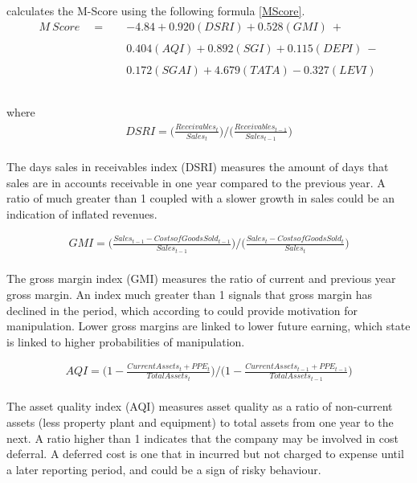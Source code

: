 {\cite{beneishOG} calculates the M-Score using the following formula \ref{MScore}.
\begin {equation}\label{MScore}
\begin{aligned}
M \ Score \quad =  \quad & -4.84 + 0.920(DSRI) + 0.528(GMI) \ + \\\\ 
		& 0.404(AQI)+ 0.892(SGI) + 0.115(DEPI) \ - \\\\
		& 0.172(SGAI) + 4.679(TATA) - 0.327(LEVI)  \ \\\\
\end{aligned}
\end{equation}\\
where
\begin {equation}\label{MScore-DSRI}
\begin{aligned}
DSRI = \bigg( \frac{Receivables_t}{Sales_t} \bigg) / \bigg( \frac{Receivables_{t-1}}{Sales_{t-1}} \bigg) 
\end{aligned}
\end{equation}\\
The days sales in receivables index (DSRI) measures the amount of days that sales are in accounts receivable in one year compared to the previous year. A ratio of much greater than 1 coupled with a slower growth in sales could be an indication of inflated revenues. 

\begin{equation}\label{MScore-GMI}
\begin{aligned}
GMI = \bigg( \frac{Sales_{t-1} - Costs of Goods Sold_{t-1}}{Sales_{t-1}} \bigg) / \bigg( \frac{Sales_{t} - Costs of Goods Sold_{t}}{Sales_{t}} \bigg)
\end{aligned}
\end{equation}\\
The gross margin index (GMI) measures the ratio of current and previous year gross margin. An index much greater than 1 signals that gross margin has declined in the period, which according to \cite{mahamaCorpFraud} could provide motivation for manipulation. Lower gross margins are linked to lower future earning, which \cite{beneishCost} state is linked to higher probabilities of manipulation.     

\begin{equation}\label{MScore-AQI}
\begin{aligned}
AQI = \bigg( 1 - \frac{Current Assets_t + PPE_t}{Total Assets_t} \bigg) /  \bigg( 1 - \frac{Current Assets_{t-1} + PPE_{t-1}}{Total Assets_{t-1}} \bigg)
\end{aligned}
\end{equation}\\
The asset quality index (AQI) measures asset quality as a ratio of non-current assets (less property plant and equipment) to total assets from one year to the next. A ratio higher than 1 indicates that the company may be involved in cost deferral. A deferred cost is one that in incurred but not charged to expense until a later reporting period, and could be a sign of risky behaviour.   

}
